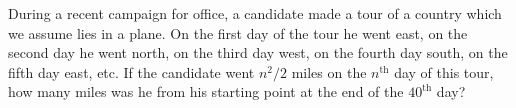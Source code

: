 During a recent campaign for office, a candidate made a tour of a country which we assume lies in a plane.  On the first day of the tour he went east, on the second day he went north, on the third day west, on the fourth day south, on the fifth day east, etc.  If the candidate went $n^2/2$ miles on the $n^{\text{th}}$ day of this tour, how many miles was he from his starting point at the end of the $40^{\text{th}}$ day?